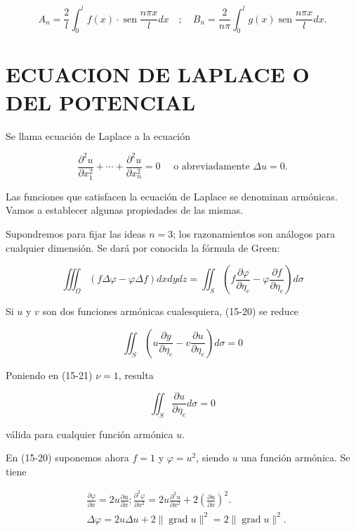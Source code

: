 \documentclass[10pt]{article}
\theoremstyle{plain}
\theoremstyle{definition}
\theoremstyle{remark}
\begin{document}
$$
A_{n}=\frac{2}{l} \int_{0}^{l} f(x) \cdot \operatorname{sen} \frac{n \pi x}{l} d x \quad ; \quad B_{n}=\frac{2}{n \pi} \int_{0}^{l} g(x) \operatorname{sen} \frac{n \pi x}{l} d x .
$$

\section*{ECUACION DE LAPLACE O DEL POTENCIAL}
Se llama ecuación de Laplace a la ecuación


\begin{equation*}
\frac{\partial^{2} u}{\partial x_{1}^{2}}+\cdots+\frac{\partial^{2} u}{\partial x_{n}^{2}}=0 \quad \text { o abreviadamente } \Delta u=0 . \tag{15-19}
\end{equation*}


Las funciones que satisfacen la ecuación de Laplace se denominan armónicas. Vamos a establecer algunas propiedades de las mismas.

Supondremos para fijar las ideas $n=3$; los razonamientos son análogos para cualquier dimensión. Se dará por conocida la fórmula de Green:


\begin{equation*}
\iiint_{\Omega}(f \Delta \varphi-\varphi \Delta f) d x d y d z=\iint_{S}\left(f \frac{\partial \varphi}{\partial \eta_{e}}-\varphi \frac{\partial f}{\partial \eta_{e}}\right) d \sigma \tag{15-20}
\end{equation*}


Si $u$ y $v$ son dos funciones armónicas cualesquiera, (15-20) se reduce


\begin{equation*}
\iint_{S}\left(u \frac{\partial y}{\partial \eta_{e}}-v \frac{\partial u}{\partial \eta_{e}}\right) d \sigma=0 \tag{15-21}
\end{equation*}


Poniendo en (15-21) $\nu=1$, resulta


\begin{equation*}
\iint_{S} \frac{\partial u}{\partial \eta_{e}} d \sigma=0 \tag{15-22}
\end{equation*}


válida para cualquier función armónica $u$.

En (15-20) suponemos ahora $f=1$ y $\varphi=u^{2}$, siendo $u$ una función armónica. Se tiene

$$
\begin{aligned}
& \frac{\partial \varphi}{\partial x}=2 u \frac{\partial u}{\partial x} ; \frac{\partial^{2} \varphi}{\partial x^{2}}=2 u \frac{\partial^{2} u}{\partial x^{2}}+2\left(\frac{\partial u}{\partial x}\right)^{2} . \\
& \Delta \varphi=2 u \Delta u+2\|\operatorname{grad} u\|^{2}=2\|\operatorname{grad} u\|^{2} .
\end{aligned}
$$
\end{document}
